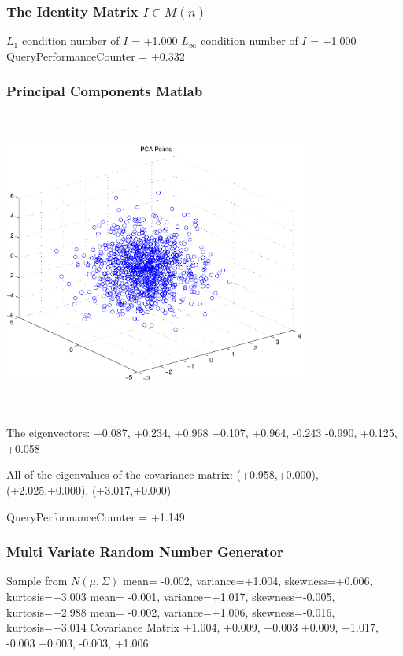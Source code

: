 \documentclass[9pt]{article}
\theoremstyle{plain}
\theoremstyle{definition}
\theoremstyle{remark}
\numberwithin{equation}{section}
\begin{document}
\subsubsection{The Identity Matrix $I \in M(n)$}
$L_1$ condition number of $I$ = +1.000
$L_\infty$ condition number of $I$ = +1.000
QueryPerformanceCounter  =  +0.332
\subsubsection{Principal Components Matlab }
\includegraphics[width=10.0cm,height=10.0cm]{PCAPoints.pdf}

The eigenvectors:
+0.087, +0.234, +0.968
+0.107, +0.964, -0.243
-0.990, +0.125, +0.058

All of the eigenvalues of the covariance matrix:
(+0.958,+0.000), (+2.025,+0.000), (+3.017,+0.000)

QueryPerformanceCounter  =  +1.149
\subsubsection{Multi Variate Random Number Generator }
Sample from $N(\mu,\Sigma)$
mean= -0.002, variance=+1.004, skewness=+0.006, kurtosis=+3.003
mean= -0.001, variance=+1.017, skewness=-0.005, kurtosis=+2.988
mean= -0.002, variance=+1.006, skewness=-0.016, kurtosis=+3.014
Covariance Matrix 
+1.004, +0.009, +0.003
+0.009, +1.017, -0.003
+0.003, -0.003, +1.006
\end{document}
